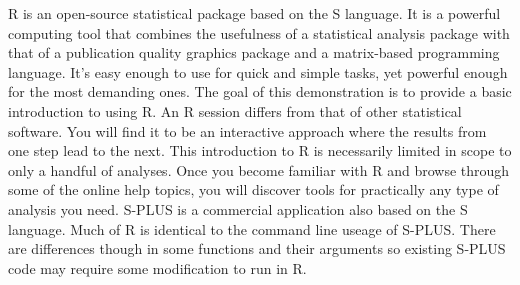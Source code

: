 
R is an open-source statistical package based on the S language. It is a powerful computing tool that combines the usefulness of a statistical analysis package with that of a publication quality graphics package and a matrix-based programming language. It's easy enough to use for quick and simple tasks, yet powerful enough for the most demanding ones. The goal of this demonstration is to provide a basic introduction to using R. An R session differs from that of other statistical software. You will find it to be an interactive approach where the results from one step lead to the next. This introduction to R is necessarily limited in scope to only a handful of analyses. Once you become familiar with R and browse through some of the online help topics, you will discover tools for practically any type of analysis you need. S-PLUS is a commercial application also based on the S language. Much of R is identical to the command line useage of S-PLUS. There are differences though in some functions and their arguments so existing S-PLUS code may require some modification to run in R. 